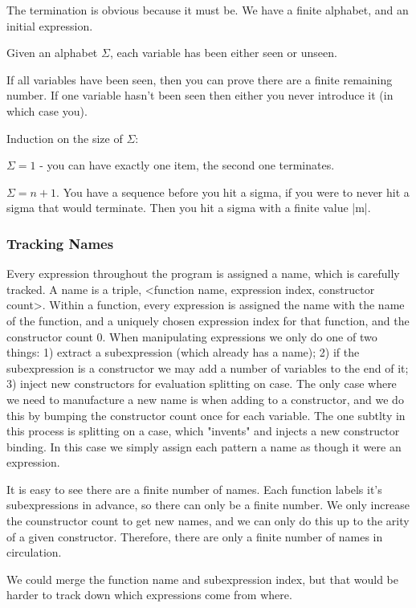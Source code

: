 \documentclass{sigplanconf}
\begin{document}
The termination is obvious because it must be. We have a finite alphabet, and an initial expression.

Given an alphabet $\Sigma$, each variable has been either seen or unseen.

If all variables have been seen, then you can prove there are a finite remaining number. If one variable hasn't been seen then either you never introduce it (in which case you).

Induction on the size of $\Sigma$:

$\Sigma = 1$ - you can have exactly one item, the second one terminates.

$\Sigma = n+1$. You have a sequence before you hit a sigma, if you were to never hit a sigma that would terminate. Then you hit a sigma with a finite value |m|.

\subsubsection{Tracking Names}

Every expression throughout the program is assigned a name, which is carefully tracked. A name is a triple, <function name, expression index, constructor count>. Within a function, every expression is assigned the name with the name of the function, and a uniquely chosen expression index for that function, and the constructor count 0. When manipulating expressions we only do one of two things: 1) extract a subexpression (which already has a name); 2) if the subexpression is a constructor we may add a number of variables to the end of it; 3) inject new constructors for evaluation splitting on case. The only case where we need to manufacture a new name is when adding to a constructor, and we do this by bumping the constructor count once for each variable. The one subtlty in this process is splitting on a case, which "invents" and injects a new constructor binding. In this case we simply assign each pattern a name as though it were an expression.

It is easy to see there are a finite number of names. Each function labels it's subexpressions in advance, so there can only be a finite number. We only increase the counstructor count to get new names, and we can only do this up to the arity of a given constructor. Therefore, there are only a finite number of names in circulation.

We could merge the function name and subexpression index, but that would be harder to track down which expressions come from where.
\end{document}
